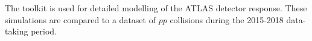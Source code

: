 The \GEANT toolkit \cite{GEANT4} is used for detailed modelling of the ATLAS detector response. These simulations are compared to a dataset of $pp$ collisions during the 2015-2018 data-taking period. 

%
%
